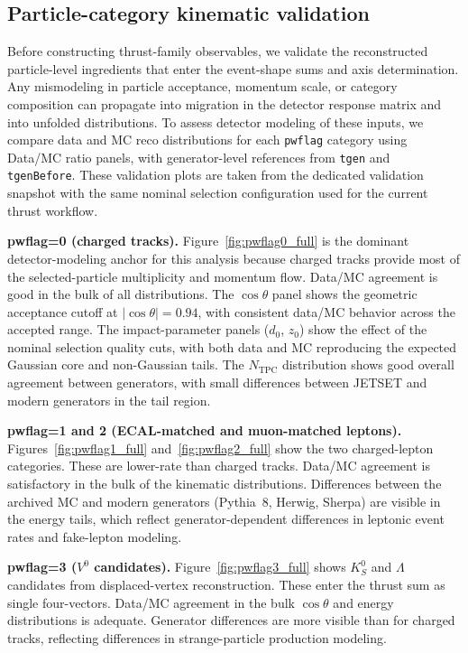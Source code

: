 \subsection{Particle-category kinematic validation}

Before constructing thrust-family observables, we validate the reconstructed particle-level
ingredients that enter the event-shape sums and axis determination. Any mismodeling in particle
acceptance, momentum scale, or category composition can propagate into migration in the detector
response matrix and into unfolded distributions. To assess detector modeling of these inputs, we
compare data and MC reco distributions for each \texttt{pwflag} category using Data/MC ratio
panels, with generator-level references from \texttt{tgen} and \texttt{tgenBefore}. These
validation plots are taken from the dedicated validation snapshot with the same nominal selection
configuration used for the current thrust workflow.



\textbf{pwflag=0 (charged tracks).} Figure~\ref{fig:pwflag0_full} is the dominant
detector-modeling anchor for this analysis because charged tracks provide most of the
selected-particle multiplicity and momentum flow. Data/MC agreement is good in the
bulk of all distributions. The $\cos\theta$ panel shows the geometric acceptance
cutoff at $|\cos\theta|=0.94$, with consistent data/MC behavior across the accepted
range. The impact-parameter panels ($d_0$, $z_0$) show the effect of the nominal
selection quality cuts, with both data and MC reproducing the expected Gaussian core
and non-Gaussian tails. The $N_{\mathrm{TPC}}$ distribution shows good overall
agreement between generators, with small differences between JETSET and modern
generators in the tail region.

\textbf{pwflag=1 and 2 (ECAL-matched and muon-matched leptons).}
Figures~\ref{fig:pwflag1_full} and~\ref{fig:pwflag2_full} show the two charged-lepton
categories. These are lower-rate than charged tracks. Data/MC agreement is satisfactory
in the bulk of the kinematic distributions. Differences between the archived MC and
modern generators (Pythia~8, Herwig, Sherpa) are visible in the energy tails, which
reflect generator-dependent differences in leptonic event rates and fake-lepton modeling.

\textbf{pwflag=3 ($V^0$ candidates).} Figure~\ref{fig:pwflag3_full} shows $K_S^0$ and
$\Lambda$ candidates from displaced-vertex reconstruction. These enter the thrust sum
as single four-vectors. Data/MC agreement in the bulk $\cos\theta$ and energy
distributions is adequate. Generator differences are more visible than for charged
tracks, reflecting differences in strange-particle production modeling.

